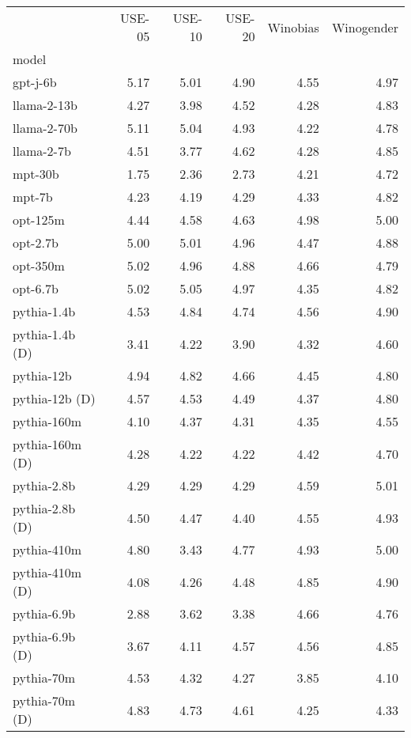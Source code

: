 \begin{tabular}{lrrrrr}
 & USE-05 & USE-10 & USE-20 & Winobias & Winogender \\
model &  &  &  &  &  \\
gpt-j-6b & 5.17 & 5.01 & 4.90 & 4.55 & 4.97 \\
llama-2-13b & 4.27 & 3.98 & 4.52 & 4.28 & 4.83 \\
llama-2-70b & 5.11 & 5.04 & 4.93 & 4.22 & 4.78 \\
llama-2-7b & 4.51 & 3.77 & 4.62 & 4.28 & 4.85 \\
mpt-30b & 1.75 & 2.36 & 2.73 & 4.21 & 4.72 \\
mpt-7b & 4.23 & 4.19 & 4.29 & 4.33 & 4.82 \\
opt-125m & 4.44 & 4.58 & 4.63 & 4.98 & 5.00 \\
opt-2.7b & 5.00 & 5.01 & 4.96 & 4.47 & 4.88 \\
opt-350m & 5.02 & 4.96 & 4.88 & 4.66 & 4.79 \\
opt-6.7b & 5.02 & 5.05 & 4.97 & 4.35 & 4.82 \\
pythia-1.4b & 4.53 & 4.84 & 4.74 & 4.56 & 4.90 \\
pythia-1.4b (D) & 3.41 & 4.22 & 3.90 & 4.32 & 4.60 \\
pythia-12b & 4.94 & 4.82 & 4.66 & 4.45 & 4.80 \\
pythia-12b (D) & 4.57 & 4.53 & 4.49 & 4.37 & 4.80 \\
pythia-160m & 4.10 & 4.37 & 4.31 & 4.35 & 4.55 \\
pythia-160m (D) & 4.28 & 4.22 & 4.22 & 4.42 & 4.70 \\
pythia-2.8b & 4.29 & 4.29 & 4.29 & 4.59 & 5.01 \\
pythia-2.8b (D) & 4.50 & 4.47 & 4.40 & 4.55 & 4.93 \\
pythia-410m & 4.80 & 3.43 & 4.77 & 4.93 & 5.00 \\
pythia-410m (D) & 4.08 & 4.26 & 4.48 & 4.85 & 4.90 \\
pythia-6.9b & 2.88 & 3.62 & 3.38 & 4.66 & 4.76 \\
pythia-6.9b (D) & 3.67 & 4.11 & 4.57 & 4.56 & 4.85 \\
pythia-70m & 4.53 & 4.32 & 4.27 & 3.85 & 4.10 \\
pythia-70m (D) & 4.83 & 4.73 & 4.61 & 4.25 & 4.33 \\
\end{tabular}
